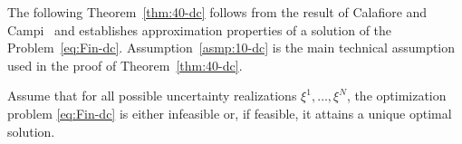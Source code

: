 

The following Theorem~\ref{thm:40-dc} follows from the result of Calafiore and Campi~\cite{calafiore2006scenario} and establishes approximation properties of a solution of the Problem~\eqref{eq:Fin-dc}. Assumption~\ref{asmp:10-dc} is the main technical assumption used in the proof of Theorem~\ref{thm:40-dc}.

\begin{assumption}\label{asmp:10-dc}
Assume that for all possible uncertainty realizations $\xi^1, \dots, \xi^N$, the optimization problem \eqref{eq:Fin-dc} is either infeasible or, if feasible, it attains a unique optimal solution.
\end{assumption}

